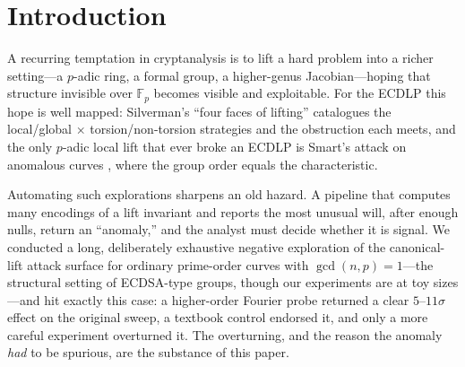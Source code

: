 \documentclass[11pt]{article}
\theoremstyle{definition}
\newcommand{\Fp}{\mathbb{F}_p}
\begin{document}
\section{Introduction}

A recurring temptation in cryptanalysis is to lift a hard problem into a
richer setting---a $p$-adic ring, a formal group, a higher-genus
Jacobian---hoping that structure invisible over $\Fp$ becomes visible and
exploitable. For the ECDLP this hope is well mapped: Silverman's ``four
faces of lifting'' \cite{silvermanlift,silverman4faces} catalogues the
local/global $\times$ torsion/non-torsion strategies and the obstruction
each meets, and the only $p$-adic local lift that ever broke an ECDLP is
Smart's attack on anomalous curves \cite{smart,satoharaki,semaev}, where
the group order equals the characteristic.

Automating such explorations sharpens an old hazard. A pipeline that
computes many encodings of a lift invariant and reports the most unusual
will, after enough nulls, return an ``anomaly,'' and the analyst must
decide whether it is signal. We conducted a long, deliberately exhaustive
negative exploration of the canonical-lift attack surface for ordinary
prime-order curves with $\gcd(n,p)=1$---the structural setting of
ECDSA-type groups, though our experiments are at toy sizes---and hit
exactly this case: a higher-order Fourier probe returned a clear
$5$--$11\sigma$ effect on the original sweep, a textbook control endorsed
it, and only a more careful experiment overturned it. The overturning, and the reason the
anomaly \emph{had} to be spurious, are the substance of this paper.
\end{document}

